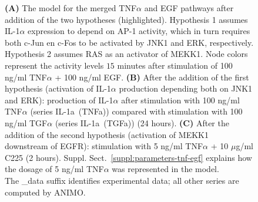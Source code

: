 \documentclass{bmcart}
\begin{document}
\begin{backmatter}
\begin{figure}[!tpb]
{{\bf(A)} %
The model for the merged TNF$\alpha$ and EGF pathways
after addition of the two hypotheses (highlighted).
Hypothesis 1 assumes IL-1$\alpha$ expression to depend on AP-1 activity, which in turn requires
both c-Jun en c-Fos to be activated by JNK1 and ERK, respectively. Hypothesis 2 assumes RAS as an activator
of MEKK1. Node colors represent the activity levels $15$ minutes
after stimulation of 100 ng/ml TNF$\alpha$ + 100 ng/ml EGF.
{\bf(B)} %
After the addition of the first hypothesis (activation of IL-1$\alpha$ production depending both
on JNK1 and ERK): production of IL-1$\alpha$ after stimulation with 100 ng/ml TNF$\alpha$ (series {\sf IL-1a~(TNFa)})
compared with stimulation with 100 ng/ml TGF$\alpha$ (series {\sf IL-1a~(TGFa)}) (24 hours).
{\bf(C)} %
After the addition of the second hypothesis (activation of MEKK1 downstream of EGFR):
stimulation with 5 ng/ml TNF$\alpha$ + 10 $\mu$g/ml C225 (2 hours).
Suppl. Sect.~\ref{suppl:parameters-tnf-egf} explains how the dosage of 5 ng/ml TNF$\alpha$ was represented in the model.\\
The {\sf \_{}data} suffix identifies experimental data; all other series are computed by ANIMO.}\label{fig:large-model-graph}\label{fig:large-model-complete}
\end{figure}






\end{backmatter}
\end{document}
